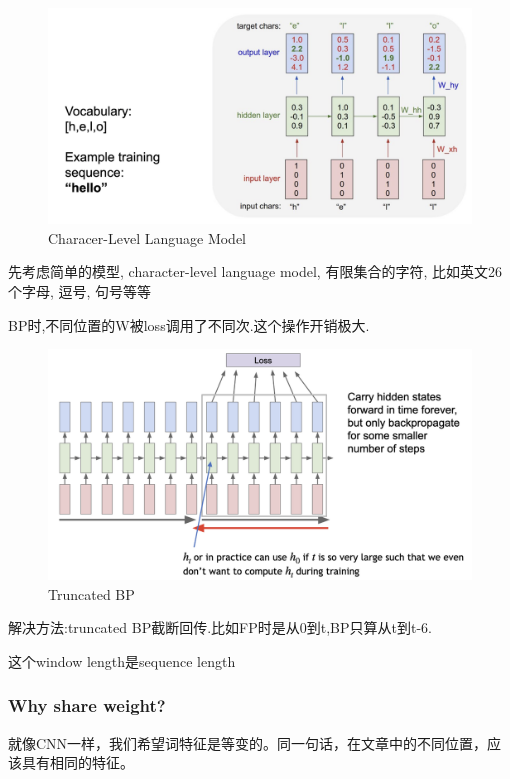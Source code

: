 	\begin{figure}[htbp]
		\centering
		\includegraphics[scale=0.2]{figures/word_model.png}
		\caption{Characer-Level Language Model}
	\end{figure}

	先考虑简单的模型, character-level language model, 有限集合的字符, 
	比如英文26个字母, 逗号, 句号等等

	BP时,不同位置的W被loss调用了不同次.这个操作开销极大.

	\begin{figure}[htbp]
		\centering
		\includegraphics[scale=0.2]{figures/truncate_bp.png}
		\caption{Truncated BP}
	\end{figure}
	
	解决方法:truncated BP截断回传.比如FP时是从0到t,BP只算从t到t-6.

	这个window length是sequence length

	\subsubsection{Why share weight?} 
	就像CNN一样，我们希望词特征是等变的。同一句话，在文章中的不同位置，应该具有相同的特征。

